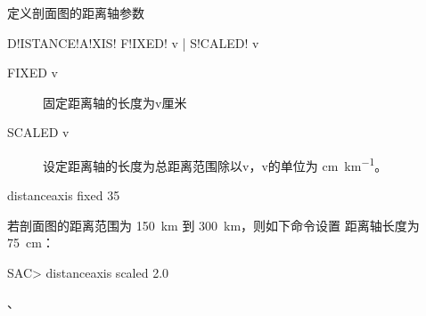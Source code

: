 \label{sss:distanceaxis}

定义剖面图的距离轴参数

\begin{SACSTX}
D!ISTANCE!A!XIS! F!IXED! v | S!CALED! v
\end{SACSTX}

\begin{description}
\item [FIXED v] 固定距离轴的长度为v厘米
\item [SCALED v] 设定距离轴的长度为总距离范围除以v，v的单位为 \si{\cm\per\km}。
\end{description}

\begin{SACDFT}
distanceaxis fixed 35
\end{SACDFT}

若剖面图的距离范围为 \SI{150}{\km} 到 \SI{300}{\km}，则如下命令设置
距离轴长度为 \SI{75}{\cm}：
\begin{SACCode}
SAC> distanceaxis scaled 2.0
\end{SACCode}

、

